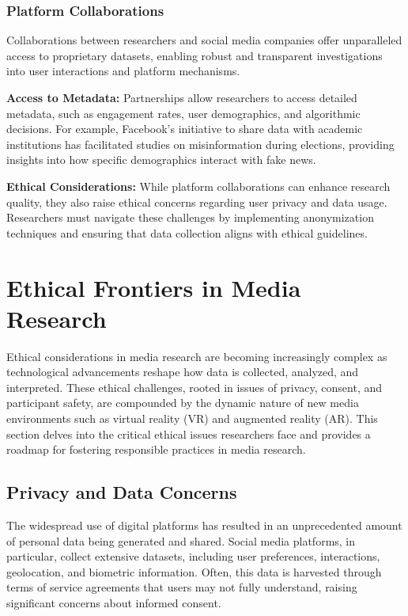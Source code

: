 \documentclass[
]{book}
\begin{document}
\subsubsection*{Platform Collaborations}\label{platform-collaborations}

Collaborations between researchers and social media companies offer unparalleled access to proprietary datasets, enabling robust and transparent investigations into user interactions and platform mechanisms.

\textbf{Access to Metadata:} Partnerships allow researchers to access detailed metadata, such as engagement rates, user demographics, and algorithmic decisions. For example, Facebook's initiative to share data with academic institutions has facilitated studies on misinformation during elections, providing insights into how specific demographics interact with fake news.

\textbf{Ethical Considerations:} While platform collaborations can enhance research quality, they also raise ethical concerns regarding user privacy and data usage. Researchers must navigate these challenges by implementing anonymization techniques and ensuring that data collection aligns with ethical guidelines.

\section{Ethical Frontiers in Media Research}\label{ethical-frontiers-in-media-research}

Ethical considerations in media research are becoming increasingly complex as technological advancements reshape how data is collected, analyzed, and interpreted. These ethical challenges, rooted in issues of privacy, consent, and participant safety, are compounded by the dynamic nature of new media environments such as virtual reality (VR) and augmented reality (AR). This section delves into the critical ethical issues researchers face and provides a roadmap for fostering responsible practices in media research.

\subsection*{Privacy and Data Concerns}\label{privacy-and-data-concerns}

The widespread use of digital platforms has resulted in an unprecedented amount of personal data being generated and shared. Social media platforms, in particular, collect extensive datasets, including user preferences, interactions, geolocation, and biometric information. Often, this data is harvested through terms of service agreements that users may not fully understand, raising significant concerns about informed consent.
\end{document}
